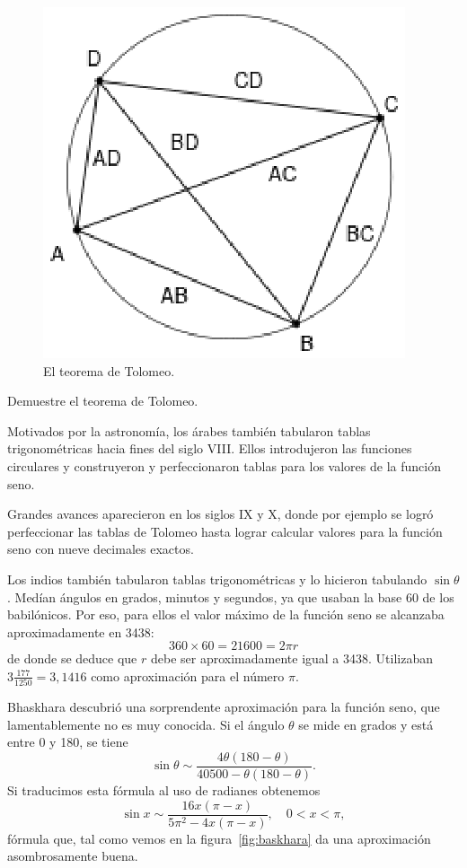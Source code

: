\begin{figure}[h]
   \centering
   \includegraphics[scale=0.6]{images/tolomeo}
   \caption{El teorema de Tolomeo.}
   \label{fig:Tolomeo}
\end{figure}

\begin{exercise}
	Demuestre el teorema de Tolomeo.
\end{exercise}

Motivados por la astronomía, los árabes también tabularon tablas
trigonométricas hacia fines del siglo VIII. Ellos introdujeron las funciones
circulares y construyeron y perfeccionaron tablas para los valores de la
función seno.  

Grandes avances aparecieron en los siglos IX y X, donde por
ejemplo se logró perfeccionar las tablas de Tolomeo hasta lograr calcular
valores para la función seno con nueve decimales exactos. 

Los indios también tabularon tablas trigonométricas y lo hicieron tabulando
$\sin\theta$.  Medían ángulos en grados, minutos y segundos, ya que usaban la
base 60 de los babilónicos. Por eso, para ellos el valor máximo de la función
seno se alcanzaba aproximadamente en 3438:
\[
	360\times 60=21600=2\pi r
\]
de donde se deduce que $r$ debe ser aproximadamente igual a 3438. Utilizaban 
$3\frac{177}{1250}=3,1416$ como aproximación para el número $\pi$. 

Bhaskhara descubrió una sorprendente aproximación para la función seno, que
lamentablemente no es muy conocida. Si el ángulo $\theta$ se mide en grados y
está entre 0 y 180, se tiene
\[
	\sin\theta\sim \frac{4\theta(180-\theta)}{40500-\theta(180-\theta)}.
\]
Si traducimos esta fórmula al uso de radianes obtenemos
\[
	\sin x\sim\frac{16x(\pi-x)}{5\pi^2-4x(\pi-x)},\quad 0<x<\pi,
\]
fórmula que, tal como vemos en la figura~\ref{fig:baskhara} da una aproximación
asombrosamente buena.  

